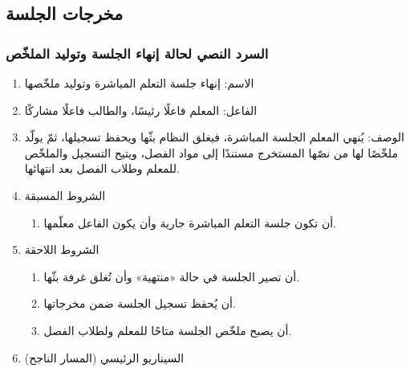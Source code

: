 \subsection{مخرجات الجلسة}

\subsubsection{السرد النصي لحالة إنهاء الجلسة وتوليد الملخّص}
\label{subsubsec:uc-session-end}

\begin{enumerate}
  \item الاسم: إنهاء جلسة التعلم المباشرة وتوليد ملخّصها
  \item الفاعل: المعلم فاعلًا رئيسًا، والطالب فاعلًا مشاركًا
  \item الوصف: يُنهي المعلم الجلسة المباشرة، فيغلق النظام بثّها ويحفظ تسجيلها، ثمّ يولّد ملخّصًا لها من نصّها المستخرج مستندًا إلى مواد الفصل، ويتيح التسجيل والملخّص للمعلم وطلاب الفصل بعد انتهائها.
  \item الشروط المسبقة
  \begin{enumerate}
    \item أن تكون جلسة التعلم المباشرة جارية وأن يكون الفاعل معلّمها.
  \end{enumerate}
  \item الشروط اللاحقة
  \begin{enumerate}
    \item أن تصير الجلسة في حالة «منتهية» وأن تُغلق غرفة بثّها.
    \item أن يُحفظ تسجيل الجلسة ضمن مخرجاتها.
    \item أن يصبح ملخّص الجلسة متاحًا للمعلم ولطلاب الفصل.
  \end{enumerate}
  \item السيناريو الرئيسي (المسار الناجح)
\end{enumerate}

